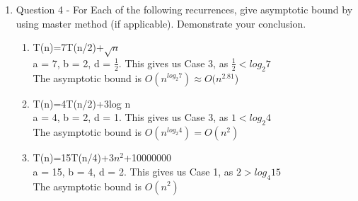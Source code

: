 \documentclass{article}
\begin{document}
\begin{enumerate}
\begin{enumerate}
\begin{proof}
        \end{proof}
      \item T(1)=1, T(n)=4T(n/2)+\(n^2\)   (I struggled with this one as well)\\
        Claim: The recurrence relation given by:\\
        $T(1)=1$\\
        $T(n)=4T(n/2)+n^2$\\
        has the solution T(n) = $T(n)=2^{logn}$\\
        \begin{proof} Proof by induction\\
          Base case: let $n=1, T(1)=2^{log1}=2^0=1$\\
          IH: assume claim holds true for some $2^u$, where $T(2^u)=2^u$\\
          Now show that claim holds true for $2^{u+1}$:\\
          $T(2^{u+1}=4T(n/2)+n^2$\\
          $ = 4T(2^{u+1}/2+2^{{u+1}^2}$
          $ = 4T(2^u)+2^{2u+2}$
          $ = 4 * 2^u+2^u*4*4$
          $ T(2^{u+1}= 132*2^{u+1}$


        \end{proof}
    \end{enumerate}
  \item Question 4 - For Each of the following recurrences, give asymptotic bound by using master method (if applicable).
    Demonstrate your conclusion.\\
    \begin{enumerate} 
        \item T(n)=7T(n/2)+$\sqrt{n}$\\
          a = 7, b = 2, d = $\frac 1 2$. This gives us Case 3, as $\frac 1 2 < log_{2} 7$\\
          The asymptotic bound is $O(n^{log_{2} 7}) \approx O(n^{2.81}$) \\

        \item T(n)=4T(n/2)+3log n\\
          a = 4, b = 2, d = 1. This gives us Case 3, as $1 < log_{2} 4$\\
          The asymptotic bound is $O(n^{log_{2} 4}) = O(n^2)$\\

        \item T(n)=15T(n/4)+\(3n^2\)+10000000\\
        a = 15, b = 4, d = 2. This gives us Case 1, as $2 > log_{4} 15$\\
        The asymptotic bound is $O(n^2)$\\


\end{enumerate}
\end{enumerate}
\end{document}
